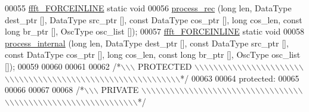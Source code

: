 \begin{DoxyCode}
00055     \hyperlink{a00089_a31b2ada863c9efa7455efae4e13661f3}{ffft\_FORCEINLINE} \textcolor{keyword}{static} \textcolor{keywordtype}{void}
00056                         \hyperlink{a00014_a814ede91583f5710bbd3d89154b310b1}{process\_rec} (\textcolor{keywordtype}{long} len, DataType dest\_ptr [], DataType src\_ptr [], \textcolor{keyword}{const} 
      DataType cos\_ptr [], \textcolor{keywordtype}{long} cos\_len, \textcolor{keyword}{const} \textcolor{keywordtype}{long} br\_ptr [], OscType osc\_list []);
00057     \hyperlink{a00089_a31b2ada863c9efa7455efae4e13661f3}{ffft\_FORCEINLINE} \textcolor{keyword}{static} \textcolor{keywordtype}{void}
00058                         \hyperlink{a00014_a0cb9d4c02a1f1b9e0f9f64dc38adf679}{process\_internal} (\textcolor{keywordtype}{long} len, DataType dest\_ptr [], \textcolor{keyword}{const} DataType 
      src\_ptr [], \textcolor{keyword}{const} DataType cos\_ptr [], \textcolor{keywordtype}{long} cos\_len, \textcolor{keyword}{const} \textcolor{keywordtype}{long} br\_ptr [], OscType osc\_list []);
00059 
00060 
00061 
00062 \textcolor{comment}{/*\(\backslash\)\(\backslash\)\(\backslash\) PROTECTED \(\backslash\)\(\backslash\)\(\backslash\)\(\backslash\)\(\backslash\)\(\backslash\)\(\backslash\)\(\backslash\)\(\backslash\)\(\backslash\)\(\backslash\)\(\backslash\)\(\backslash\)\(\backslash\)\(\backslash\)\(\backslash\)\(\backslash\)\(\backslash\)\(\backslash\)\(\backslash\)\(\backslash\)\(\backslash\)\(\backslash\)\(\backslash\)\(\backslash\)\(\backslash\)\(\backslash\)\(\backslash\)\(\backslash\)\(\backslash\)\(\backslash\)\(\backslash\)\(\backslash\)\(\backslash\)\(\backslash\)\(\backslash\)\(\backslash\)\(\backslash\)\(\backslash\)\(\backslash\)\(\backslash\)\(\backslash\)\(\backslash\)\(\backslash\)\(\backslash\)\(\backslash\)\(\backslash\)\(\backslash\)\(\backslash\)\(\backslash\)\(\backslash\)\(\backslash\)\(\backslash\)\(\backslash\)\(\backslash\)\(\backslash\)\(\backslash\)\(\backslash\)\(\backslash\)\(\backslash\)*/}
00063 
00064 \textcolor{keyword}{protected}:
00065 
00066 
00067 
00068 \textcolor{comment}{/*\(\backslash\)\(\backslash\)\(\backslash\) PRIVATE \(\backslash\)\(\backslash\)\(\backslash\)\(\backslash\)\(\backslash\)\(\backslash\)\(\backslash\)\(\backslash\)\(\backslash\)\(\backslash\)\(\backslash\)\(\backslash\)\(\backslash\)\(\backslash\)\(\backslash\)\(\backslash\)\(\backslash\)\(\backslash\)\(\backslash\)\(\backslash\)\(\backslash\)\(\backslash\)\(\backslash\)\(\backslash\)\(\backslash\)\(\backslash\)\(\backslash\)\(\backslash\)\(\backslash\)\(\backslash\)\(\backslash\)\(\backslash\)\(\backslash\)\(\backslash\)\(\backslash\)\(\backslash\)\(\backslash\)\(\backslash\)\(\backslash\)\(\backslash\)\(\backslash\)\(\backslash\)\(\backslash\)\(\backslash\)\(\backslash\)\(\backslash\)\(\backslash\)\(\backslash\)\(\backslash\)\(\backslash\)\(\backslash\)\(\backslash\)\(\backslash\)\(\backslash\)\(\backslash\)\(\backslash\)\(\backslash\)\(\backslash\)\(\backslash\)\(\backslash\)\(\backslash\)\(\backslash\)*/}

\end{DoxyCode}
